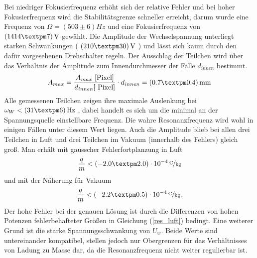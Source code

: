 \documentclass[a4paper,12pt]{article}
\begin{document}
Bei niedriger Fokusierfrequenz erhöht sich der relative Fehler und bei hoher Fokusierfrequenz wird die Stabilitätsgrenze schneller erreicht,
darum wurde eine Frequenz von $Ω = (503±6)\unit{Hz}$ und eine Fokusierfrequenz von $\unit[(1414±7)]{V}$ gewählt.
Die Amplitude der Wechselspannung unterliegt starken Schwankungen
( $ \unit[( 210 ± 30 )]{V} $ )
und lässt sich kaum durch den dafür vorgesehenen Drehschalter regeln.
Der Ausschlag der Teilchen wird über das Verhältnis der Amplitude zum Innendurchmesser der Falle $d_{innen}$ bestimmt.
$$A_{max} = \frac{A_{max}\text{ [Pixel]}}{d_{innen}\text{[ Pixel]}} \cdot d_{innen}= \unit[( 0.7 ± 0.4 )]{mm} $$
Alle gemessenen Teilchen zeigen ihre maximale Auslenkung bei $\omega_W < \unit[(31±6)]{Hz}$ ,
dabei handelt es sich um die minimal an der Spannungsquelle einstellbare Frequenz.
Die wahre Resonanzfrequenz wird wohl in einigen Fällen unter diesem Wert liegen.
Auch die Amplitude blieb bei allen drei Teilchen in Luft und drei Teilchen im Vakuum (innerhalb des Fehlers) gleich groß.
Man erhält mit gausscher Fehlerfortplanzung in Luft
$$\frac{q}{m} < \unitfrac[( -2.0 ± 2.0 ) \cdot 10^{-4}]{C}{kg}$$
und mit der Näherung für Vakuum
$$\frac{q}{m} < \unitfrac[( -2.2 ± 0.5 ) \cdot 10^{-4}]{C}{kg}.$$
Der hohe Fehler bei der genauen Lösung ist durch die Differenzen von hohen Potenzen fehlerbehafteter Größen in Gleichung (\ref{res_luft}) bedingt.
Eine weiterer Grund ist die starke Spannungsschwankung von  $U_w$.
Beide Werte sind untereinander kompatibel, stellen jedoch nur Obergrenzen für das Verhältnisses von Ladung zu Masse dar, da die Resonanzfrequenz nicht weiter regulierbar ist.

\end{document}
